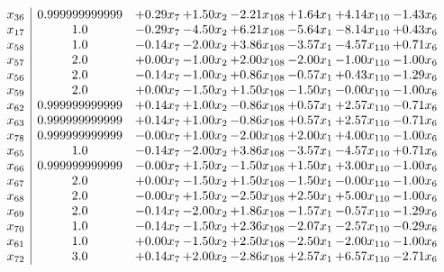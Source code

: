 \documentclass[8pt]{article}
\begin{document}
\[\begin{array}{c| c c@{\hskip 2pt} c@{\hskip 2pt} c@{\hskip 2pt} c@{\hskip 2pt} c@{\hskip 2pt} c@{\hskip 2pt} }
 x_{36}   &  0.999999999999 & +  0.29 x_{7} & +  1.50 x_{2} & -2.21 x_{108} & +  1.64 x_{1} & +  4.14 x_{110} & -1.43 x_{6}\\
 x_{17}   &  1.0 & -0.29 x_{7} & -4.50 x_{2} & +  6.21 x_{108} & -5.64 x_{1} & -8.14 x_{110} & +  0.43 x_{6}\\
 x_{58}   &  1.0 & -0.14 x_{7} & -2.00 x_{2} & +  3.86 x_{108} & -3.57 x_{1} & -4.57 x_{110} & +  0.71 x_{6}\\
 x_{57}   &  2.0 & +  0.00 x_{7} & -1.00 x_{2} & +  2.00 x_{108} & -2.00 x_{1} & -1.00 x_{110} & -1.00 x_{6}\\
 x_{56}   &  2.0 & -0.14 x_{7} & -1.00 x_{2} & +  0.86 x_{108} & -0.57 x_{1} & +  0.43 x_{110} & -1.29 x_{6}\\
 x_{59}   &  2.0 & +  0.00 x_{7} & -1.50 x_{2} & +  1.50 x_{108} & -1.50 x_{1} & -0.00 x_{110} & -1.00 x_{6}\\
 x_{62}   &  0.999999999999 & +  0.14 x_{7} & +  1.00 x_{2} & -0.86 x_{108} & +  0.57 x_{1} & +  2.57 x_{110} & -0.71 x_{6}\\
 x_{63}   &  0.999999999999 & +  0.14 x_{7} & +  1.00 x_{2} & -0.86 x_{108} & +  0.57 x_{1} & +  2.57 x_{110} & -0.71 x_{6}\\
 x_{78}   &  0.999999999999 & -0.00 x_{7} & +  1.00 x_{2} & -2.00 x_{108} & +  2.00 x_{1} & +  4.00 x_{110} & -1.00 x_{6}\\
 x_{65}   &  1.0 & -0.14 x_{7} & -2.00 x_{2} & +  3.86 x_{108} & -3.57 x_{1} & -4.57 x_{110} & +  0.71 x_{6}\\
 x_{66}   &  0.999999999999 & -0.00 x_{7} & +  1.50 x_{2} & -1.50 x_{108} & +  1.50 x_{1} & +  3.00 x_{110} & -1.00 x_{6}\\
 x_{67}   &  2.0 & +  0.00 x_{7} & -1.50 x_{2} & +  1.50 x_{108} & -1.50 x_{1} & -0.00 x_{110} & -1.00 x_{6}\\
 x_{68}   &  2.0 & -0.00 x_{7} & +  1.50 x_{2} & -2.50 x_{108} & +  2.50 x_{1} & +  5.00 x_{110} & -1.00 x_{6}\\
 x_{69}   &  2.0 & -0.14 x_{7} & -2.00 x_{2} & +  1.86 x_{108} & -1.57 x_{1} & -0.57 x_{110} & -1.29 x_{6}\\
 x_{70}   &  1.0 & -0.14 x_{7} & -1.50 x_{2} & +  2.36 x_{108} & -2.07 x_{1} & -2.57 x_{110} & -0.29 x_{6}\\
 x_{61}   &  1.0 & +  0.00 x_{7} & -1.50 x_{2} & +  2.50 x_{108} & -2.50 x_{1} & -2.00 x_{110} & -1.00 x_{6}\\
 x_{72}   &  3.0 & +  0.14 x_{7} & +  2.00 x_{2} & -2.86 x_{108} & +  2.57 x_{1} & +  6.57 x_{110} & -2.71 x_{6}\\

\end{array}\]
\end{document}
